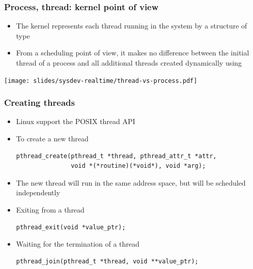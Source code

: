 \begin{frame}
  \frametitle{Process, thread: kernel point of view}
  \begin{itemize}
  \item The kernel represents each thread running in the system by a structure of
    type 
  \item From a scheduling point of view, it makes no difference
    between the initial thread of a process and all additional threads
    created dynamically using 
  \end{itemize}
  \begin{center}
    \texttt{[image: slides/sysdev-realtime/thread-vs-process.pdf]}
  \end{center}
\end{frame}

\begin{frame}[fragile]
  \frametitle{Creating threads}
  \begin{itemize}
  \item Linux support the POSIX thread API
  \item To create a new thread
    \begin{block}{}
\small
\begin{verbatim}
pthread_create(pthread_t *thread, pthread_attr_t *attr,
               void *(*routine)(*void*), void *arg);
\end{verbatim}
\normalsize
    \end{block}
  \item The new thread will run in the same address space, but will be
    scheduled independently
  \item Exiting from a thread
    \begin{block}{}
\small
\begin{verbatim}
pthread_exit(void *value_ptr);
\end{verbatim}
\normalsize
    \end{block}
  \item Waiting for the termination of a thread
    \begin{block}{}
\small
\begin{verbatim}
pthread_join(pthread_t *thread, void **value_ptr);
\end{verbatim}
\normalsize
    \end{block}
  \end{itemize}
\end{frame}

